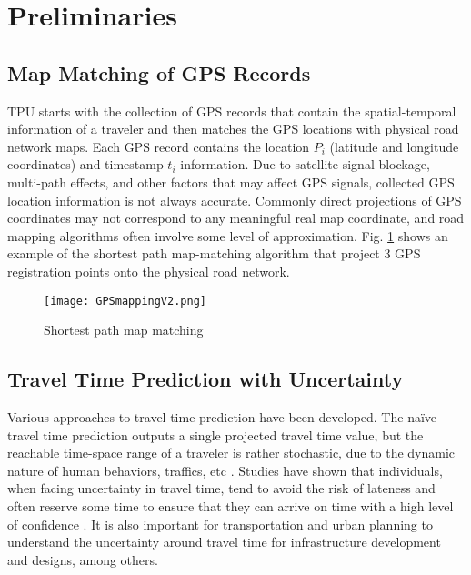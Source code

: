 \documentclass[10pt,journal,compsoc]{IEEEtran}
\begin{document}
\vspace{-9pt}\section{Preliminaries}\label{sec:prelim}
\vspace{-3pt} \subsection{Map Matching of GPS Records}\vspace{-3pt}
TPU starts with the collection of GPS records that contain the spatial-temporal information of a traveler and then matches the GPS locations with physical road network maps. Each GPS record contains the location  $P_i$ (latitude and longitude coordinates) and timestamp $t_i$ information. Due to satellite signal blockage, multi-path effects, and other factors that may affect GPS signals,  collected GPS location information is not always accurate.  Commonly direct projections of GPS coordinates may not correspond to any meaningful real map coordinate, and road mapping algorithms often involve some level of approximation.  Fig. \ref{fig:gps mapping} shows an example of the shortest path map-matching algorithm  \cite{orda1990shortest} that project 3 GPS registration points onto the physical road network.
\begin{figure}[!htb]\vspace{-9pt}
\centering \texttt{[image: GPSmappingV2.png]}\vspace{-3pt}
\caption{Shortest path map matching}\label{fig:gps mapping}
\end{figure}\vspace{-15pt}   

\subsection{Travel Time Prediction with Uncertainty}\vspace{-3pt}
Various approaches to travel time prediction have  been  developed. The na\"ive travel time prediction outputs a single projected travel time value, but the reachable time-space range of a traveler is rather stochastic, due to the dynamic nature of  human  behaviors, traffics, etc \cite{noland1995travel}. Studies \cite{chen2017most} have shown that individuals, when facing uncertainty in travel time,  tend to avoid the risk of lateness and often reserve some time to ensure that they can arrive on time with a high level of confidence \cite{de2013unique}. It is also important for transportation and urban planning to understand the uncertainty around travel time for infrastructure development and designs, among others. 
\end{document}
